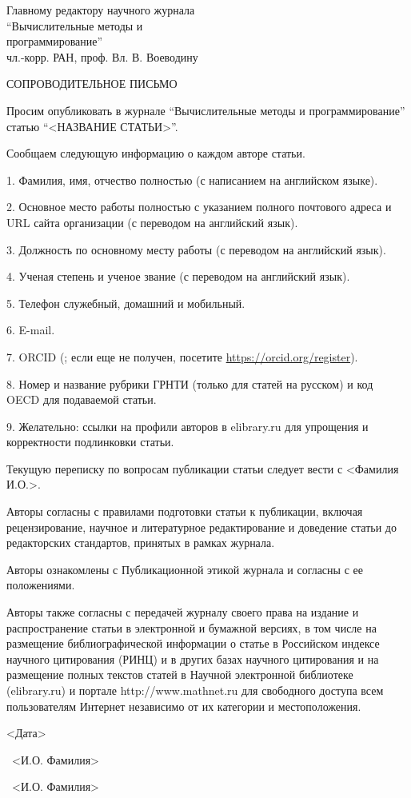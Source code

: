 \documentclass[10pt,a4paper]{book}
\begin{document}
{\large
\hfill\parbox[t]{80mm}{
Главному редактору научного журнала\\[2mm]
``Вычислительные методы и\\
программирование''\\[2mm]
чл.-корр. РАН, проф. Вл. В. Воеводину
}
\vspace*{12mm}
\begin{center}
СОПРОВОДИТЕЛЬНОЕ ПИСЬМО
\end{center}

\vspace*{3mm}

Просим опубликовать в журнале ``Вычислительные методы и программирование'' статью 
``<НАЗВАНИЕ СТАТЬИ>''.

Сообщаем следующую информацию о каждом авторе статьи.

1. Фамилия, имя, отчество полностью (с написанием на английском языке).

2. Основное место работы полностью с указанием полного почтового адреса и URL сайта организации (с переводом на английский язык).

3. Должность по основному месту работы (с переводом на английский язык).

4. Ученая степень и ученое звание (с переводом на английский язык).

5. Телефон служебный, домашний и мобильный.

6. E-mail.

7. ORCID (; если еще не получен, посетите \url{https://orcid.org/register}).

8. Номер и название рубрики ГРНТИ (только для статей на русском) и код OECD для подаваемой статьи.

9. Желательно: ссылки на профили авторов в elibrary.ru для упрощения и корректности подлинковки статьи.

\vspace*{2mm}
Текущую переписку по вопросам публикации статьи следует вести с <Фамилия И.О.>.

\vspace*{2mm}
Авторы согласны с правилами подготовки статьи к публикации, включая рецензирование, 
научное и литературное редактирование и доведение статьи до редакторских стандартов, 
принятых в рамках журнала.

Авторы ознакомлены с Публикационной этикой журнала и согласны с ее положениями.

Авторы также согласны с передачей журналу своего права на издание и распространение 
статьи в электронной и бумажной версиях, в том числе на размещение библиографической 
информации о статье в Российском индексе научного цитирования (РИНЦ) и в других базах 
научного цитирования и на размещение полных текстов статей в Научной электронной 
библиотеке (elibrary.ru) и портале http://www.mathnet.ru для свободного доступа всем пользователям Интернет независимо от их категории и местоположения.

\vspace*{15mm}
<Дата>\hfill\parbox[t]{70mm}{\hrulefill~<И.О. Фамилия>}

\vspace*{8mm}

\hfill\parbox[t]{70mm}{\hrulefill~<И.О. Фамилия>}

}%
\end{document}
